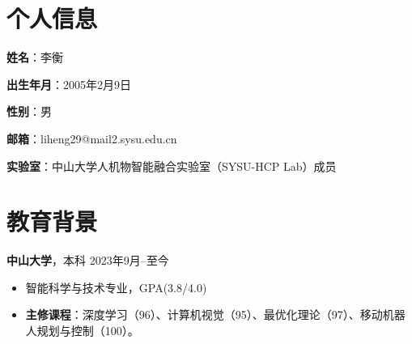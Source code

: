 \documentclass[11pt]{article}
\newlength{\iconwidth}
\begin{document}
    \begin{minipage}[t]{0.78\textwidth}
        \begin{minipage}[t]{\textwidth}
        \section[个人信息]{\makebox[\iconwidth][c]{\color{primary_color}{\faAddressCard}}\quad 个人信息}
        \begin{minipage}[t]{0.5\textwidth}
            \textbf{姓\qquad 名}：李衡
            
            \vspace{0.5em}
            \textbf{出生年月}：2005年2月9日
        \end{minipage}
        \begin{minipage}[t]{0.35\textwidth}
            \textbf{性\qquad 别}：男
            
            \vspace{0.5em}
            \textbf{邮箱}：liheng29@mail2.sysu.edu.cn
        \end{minipage}
        \vspace{0.9em}
        \par\noindent\textbf{实验室}：中山大学人机物智能融合实验室（SYSU-HCP Lab）成员
        \vspace{1.2em}
        \end{minipage}

        \begin{minipage}[t]{\textwidth}
        \section[教育背景]{\makebox[\iconwidth][c]{\color{primary_color}{\faGraduationCap}}\quad 教育背景}
        
        
        \vspace{0.5em}
        {\large \textbf{中山大学}}，本科 \hfill 2023年9月--至今
        \begin{itemize}
            \item 智能科学与技术专业，GPA(3.8/4.0)
            \item \textbf{主修课程}：深度学习（96）、计算机视觉（95）、最优化理论（97）、移动机器人规划与控制（100）。
        \end{itemize}
        
        \vspace{1.2em}
        \end{minipage}
    \end{minipage}
\end{document}
